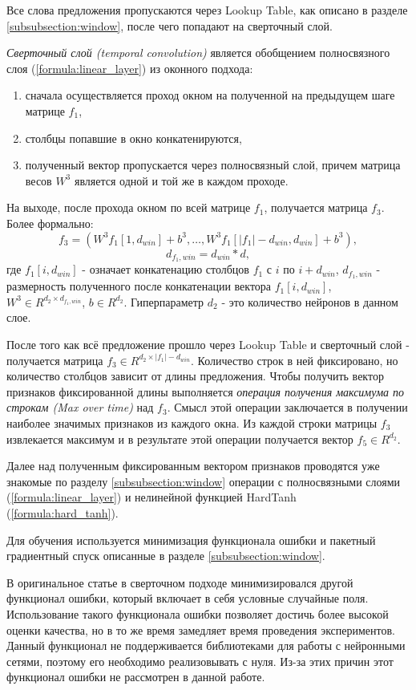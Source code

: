   Все слова предложения пропускаются через Lookup Table, как описано в разделе
  \ref{subsubsection:window}, после чего попадают на сверточный слой.

  \textit{Сверточный слой (temporal convolution)} является обобщением
  полносвязного слоя (\ref{formula:linear_layer}) из оконного подхода:
  \begin{enumerate}
    \item сначала осуществляется проход окном на полученной на предыдущем шаге матрице $f_1$,
    \item столбцы попавшие в окно конкатенируются,
    \item полученный вектор пропускается через полносвязный слой,
    причем матрица весов $W^3$ является одной и той же в каждом проходе.
  \end{enumerate}
  На выходе, после прохода окном по всей матрице $f_1$, получается матрица $f_3$.
  Более формально:
  \[
  f_3 =(W^3 f_1[1, d_{win}] + b^3,\ldots,W^3 f_1[|f_1| - d_{win}, d_{win}] + b^3),
  \]
  \[
  d_{f_1, win} = d_{win}*d,
  \]
  где $f_1[i, d_{win}]$ - означает конкатенацию столбцов $f_1$ с $i$ по $i + d_{win}$,
  $d_{f_1, win}$ - размерность полученного после конкатенации вектора $f_1[i, d_{win}]$,
  $W^3 \in R^{d_{2} \times d_{f_1, win}}$, $b \in R^{d_2}$. Гиперпараметр $d_{2}$ -
  это количество нейронов в данном слое.

  После того как всё предложение прошло через Lookup Table и сверточный слой -
  получается матрица $f_3 \in R^{d_2\times |f_1| - d_{win}}$.
  Количество строк в ней фиксировано, но количество столбцов зависит от длины предложения.
  Чтобы получить вектор признаков фиксированной длины выполняется \textit{операция
  получения максимума по строкам (Max over time)} над $f_3$.
  Смысл этой операции заключается в получении наиболее значимых признаков из каждого окна.
  Из каждой строки матрицы $f_3$ извлекается максимум и в результате этой
  операции получается вектор $f_5 \in R^{d_2}$.

  Далее над полученным фиксированным вектором признаков проводятся уже
  знакомые по разделу \ref{subsubsection:window}
  операции с полносвязными слоями (\ref{formula:linear_layer}) и
  нелинейной функцией HardTanh (\ref{formula:hard_tanh}).

  Для обучения используется минимизация функционала ошибки и пакетный градиентный
  спуск описанные в разделе \ref{subsubsection:window}.

  В оригинальное статье \citep{collobert2011natural} в сверточном подходе
  минимизировался другой функционал ошибки, который включает в себя условные случайные поля.
  Использование такого функционала ошибки позволяет достичь более высокой оценки качества,
  но в то же время замедляет время проведения экспериментов.
  Данный функционал не поддерживается библиотеками для работы с нейронными сетями,
  поэтому его необходимо реализовывать с нуля.
  Из-за этих причин этот функционал ошибки не рассмотрен в данной работе.

